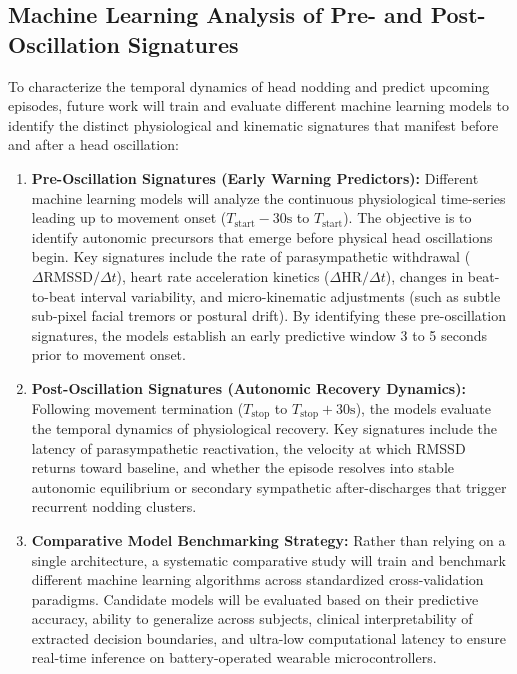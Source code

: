 \documentclass[12pt,a4paper,oneside]{report}
\begin{document}
\subsection{Machine Learning Analysis of Pre- and Post-Oscillation Signatures}
To characterize the temporal dynamics of head nodding and predict upcoming episodes, future work will train and evaluate different machine learning models to identify the distinct physiological and kinematic signatures that manifest before and after a head oscillation:
\begin{enumerate}[leftmargin=1.5cm, label=\textbf{\arabic*.}]
    \item \textbf{Pre-Oscillation Signatures (Early Warning Predictors):} 
    Different machine learning models will analyze the continuous physiological time-series leading up to movement onset ($T_{\text{start}} - 30\text{s}$ to $T_{\text{start}}$). The objective is to identify autonomic precursors that emerge before physical head oscillations begin. Key signatures include the rate of parasympathetic withdrawal ($\Delta\text{RMSSD}/\Delta t$), heart rate acceleration kinetics ($\Delta\text{HR}/\Delta t$), changes in beat-to-beat interval variability, and micro-kinematic adjustments (such as subtle sub-pixel facial tremors or postural drift). By identifying these pre-oscillation signatures, the models establish an early predictive window 3 to 5 seconds prior to movement onset.
    
    \item \textbf{Post-Oscillation Signatures (Autonomic Recovery Dynamics):} 
    Following movement termination ($T_{\text{stop}}$ to $T_{\text{stop}} + 30\text{s}$), the models evaluate the temporal dynamics of physiological recovery. Key signatures include the latency of parasympathetic reactivation, the velocity at which RMSSD returns toward baseline, and whether the episode resolves into stable autonomic equilibrium or secondary sympathetic after-discharges that trigger recurrent nodding clusters.
    
    \item \textbf{Comparative Model Benchmarking Strategy:} 
    Rather than relying on a single architecture, a systematic comparative study will train and benchmark different machine learning algorithms across standardized cross-validation paradigms. Candidate models will be evaluated based on their predictive accuracy, ability to generalize across subjects, clinical interpretability of extracted decision boundaries, and ultra-low computational latency to ensure real-time inference on battery-operated wearable microcontrollers.
\end{enumerate}
\end{document}
